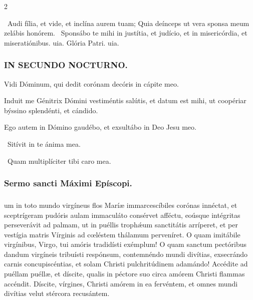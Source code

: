 \documentclass[9pt,twoside]{extarticle}
\begin{document}
\begin{multicols}{2}
{{\begin{tightlist}{}
\item {}~Audi fília, et vide, et inclína aurem tuam; \textred{*} Quia deínceps ut vera sponsa meum zelábis honórem. ~Sponsábo te mihi in justítia, et judício, et in misericórdia, et miseratiónibus. uia. Glória Patri. uia.
\end{tightlist}

\subsubsection*{\center \textsc{IN SECUNDO NOCTURNO.}}
\begin{tightlist}{}
\item {} Vidi Dóminum, qui dedit corónam decóris in cápite meo.
\item {} Induit me Génitrix Dómini vestiméntis salútis, et datum est mihi, ut coopériar býssino splendénti, et cándido.
\item {} Ego autem in Dómino gaudébo, et exsultábo in Deo Jesu meo.
\item {}~Sitívit in te ánima mea.
\item {}~Quam multiplíciter tibi caro mea.
\end{tightlist}

\subsubsection*{\center Sermo sancti Máximi Epíscopi.}
\subsubsection*{\center {}}
um in toto mundo virgíneus flos Maríæ immarcescíbiles corónas innéctat, et sceptrígeram pudóris aulam immaculáto consérvet afféctu, eoúsque intégritas perseverávit ad palmam, ut in puéllis trophǽum sanctitátis arríperet, et per vestígia matris Vírginis ad cœléstem thálamum perveníret. O quam imitábile virgínibus, Virgo, tui amóris tradidísti exémplum! O quam sanctum pectóribus dandum virgíneis tribuísti respónsum, contemnéndo mundi divítias, exsecrándo carnis concupiscéntias, et solam Christi pulchritúdinem adamándo! Accédite ad puéllam puéllæ, et díscite, qualis in péctore suo circa amórem Christi flammas accéndit. Díscite, vírgines, Christi amórem in ea fervéntem, et omnes mundi divítias velut stércora recusántem.

}}
\end{multicols}
\end{document}
